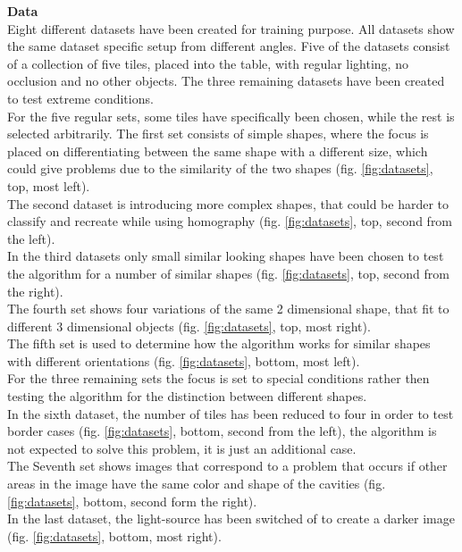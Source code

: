 \documentclass{article}
\begin{document}
\textbf{Data}\\

Eight different datasets have been created for training purpose. All datasets show the same dataset specific setup from different angles. Five of the datasets consist of a collection of five tiles, placed into the table, with regular lighting, no occlusion and no other objects. The three remaining datasets have been created to test extreme conditions.\\
For the five regular sets, some tiles have specifically been chosen, while the rest is selected arbitrarily. The first set consists of simple shapes, where the focus is placed on differentiating between the same shape with a different size, which could give problems due to the similarity of the two shapes (fig. \ref{fig:datasets}, top, most left).\\
The second dataset is introducing more complex shapes, that could be harder to classify and recreate while using homography (fig. \ref{fig:datasets}, top, second from the left).\\
In the third datasets only small similar looking shapes have been chosen to test the algorithm for a number of similar shapes (fig. \ref{fig:datasets}, top, second from the right).\\
The fourth set shows four variations of the same 2 dimensional shape, that fit to different 3 dimensional objects (fig. \ref{fig:datasets}, top, most right).\\
The fifth set is used to determine how the algorithm works for similar shapes with different orientations (fig. \ref{fig:datasets}, bottom, most left).\\
For the three remaining sets the focus is set to special conditions rather then testing the algorithm for the distinction between different shapes.\\
In the sixth dataset, the number of tiles has been reduced to four in order to test border cases (fig. \ref{fig:datasets}, bottom, second from the left), the algorithm is not expected to solve this problem, it is just an additional case.\\
The Seventh set shows images that correspond to a problem that occurs if other areas in the image have the same color and shape of the cavities (fig. \ref{fig:datasets}, bottom, second form the right).\\
In the last dataset, the light-source has been switched of to create a darker image (fig. \ref{fig:datasets}, bottom, most right).\\
\end{document}
